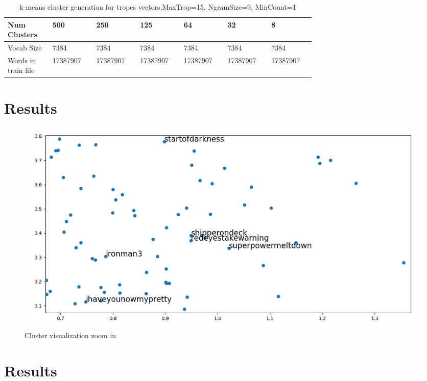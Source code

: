 \documentclass[letterpaper]{article}
\begin{document}
	\begin{table}[ht]
		\centering
		\begin{tabular}{|p{0.1\linewidth}|p{0.1\linewidth}|p{0.1\linewidth}|p{0.1\linewidth}|p{0.1\linewidth}|p{0.1\linewidth}|p{0.1\linewidth}|}
			\hline
			\textbf{Num Clusters}& \textbf{500} & \textbf{250} & \textbf{125} & \textbf{64} & \textbf{32} & \textbf{8}\\
			\hline
			\hline
			Vocab Size& 7384 & 7384 & 7384 & 7384 & 7384 & 7384\\
			\hline
			Words in train file& 17387907 & 17387907 & 17387907 & 17387907 & 17387907 & 17387907\\
			\hline
			
		\end{tabular}
		\caption{k-means cluster generation for tropes vectors.MaxTrop=15, NgramSize=9, MinCount=1}
		\label{tab:k-means-clusters}
	\end{table}	
	
	
	
	\section{Results}
	\label{sec:res}
	
		\begin{figure}
		\centering
		\includegraphics[width=1\linewidth]{../images/cluster-36-visualization-new-corpus-v3-1024-ironman3-font-16-zoom-in.png}
		\caption{Cluster visualization zoom in}
		\label{fig:cluster-visualization-zoom-in}
	\end{figure}
	
	
		\section{Results}
	\label{sec:res}
	
\end{document}
